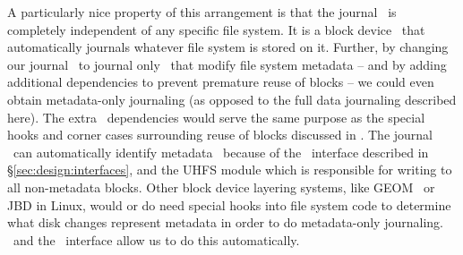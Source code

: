 A particularly nice property of this arrangement is that the journal \module\ is
completely independent of any specific file system. It is a block device
\module\ that automatically journals whatever file system is stored on it.
Further, by changing our journal \module\ to journal only \chdescs\ that modify
file system metadata -- and by adding additional dependencies to prevent
premature reuse of blocks -- we could even obtain metadata-only journaling (as
opposed to the full data journaling described here). The extra \chdesc\
dependencies would serve the same purpose as the special hooks and corner cases
surrounding reuse of blocks discussed in \cite{tweedie00ext3}. The journal
\module\ can automatically identify metadata \chdescs\ because of the \LFS\
interface described in \S\ref{sec:design:interfaces}, and the UHFS module which
is responsible for writing to all non-metadata blocks. Other block device
layering systems, like GEOM~\cite{geom} or JBD in Linux, would or do need
special hooks into file system code to determine what disk changes represent
metadata in order to do metadata-only journaling. \Chdescs\ and the \LFS\
interface allow us to do this automatically.
